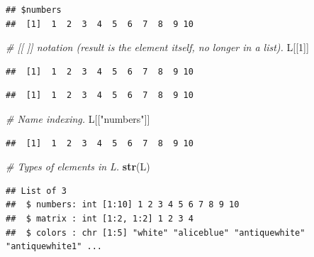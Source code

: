 \documentclass[
]{book}
\newenvironment{Shaded}{\begin{snugshade}}{\end{snugshade}}
\newcommand{\CommentTok}[1]{\textcolor[rgb]{0.56,0.35,0.01}{\textit{#1}}}
\newcommand{\DecValTok}[1]{\textcolor[rgb]{0.00,0.00,0.81}{#1}}
\newcommand{\FunctionTok}[1]{\textcolor[rgb]{0.13,0.29,0.53}{\textbf{#1}}}
\newcommand{\NormalTok}[1]{#1}
\newcommand{\SpecialCharTok}[1]{\textcolor[rgb]{0.81,0.36,0.00}{\textbf{#1}}}
\newcommand{\StringTok}[1]{\textcolor[rgb]{0.31,0.60,0.02}{#1}}
\begin{document}
\begin{verbatim}
## $numbers
##  [1]  1  2  3  4  5  6  7  8  9 10
\end{verbatim}

\begin{Shaded}
\begin{Highlighting}[]
\CommentTok{\# [[ ]] notation (result is the element itself, no longer in a list).}
\NormalTok{L[[}\DecValTok{1}\NormalTok{]]}
\end{Highlighting}
\end{Shaded}

\begin{verbatim}
##  [1]  1  2  3  4  5  6  7  8  9 10
\end{verbatim}

\begin{Shaded}
\end{Shaded}

\begin{verbatim}
##  [1]  1  2  3  4  5  6  7  8  9 10
\end{verbatim}

\begin{Shaded}
\begin{Highlighting}[]
\CommentTok{\# Name indexing.}
\NormalTok{L[[}\StringTok{"numbers"}\NormalTok{]]}
\end{Highlighting}
\end{Shaded}

\begin{verbatim}
##  [1]  1  2  3  4  5  6  7  8  9 10
\end{verbatim}

\begin{Shaded}
\begin{Highlighting}[]
\CommentTok{\# Types of elements in L.}
\FunctionTok{str}\NormalTok{(L)}
\end{Highlighting}
\end{Shaded}

\begin{verbatim}
## List of 3
##  $ numbers: int [1:10] 1 2 3 4 5 6 7 8 9 10
##  $ matrix : int [1:2, 1:2] 1 2 3 4
##  $ colors : chr [1:5] "white" "aliceblue" "antiquewhite" "antiquewhite1" ...
\end{verbatim}
\end{document}
